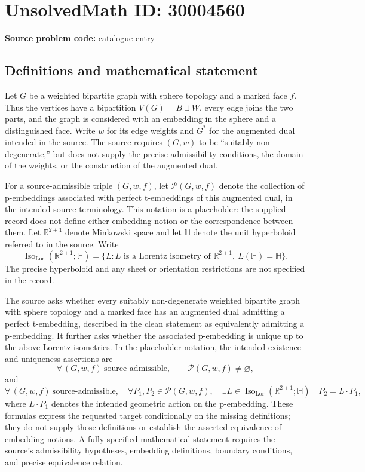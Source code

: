 \documentclass[11pt]{article}
\begin{document}
\section*{UnsolvedMath ID: 30004560}
\textbf{Source problem code:} catalogue entry
\subsection{Definitions and mathematical statement}
Let \(G\) be a weighted bipartite graph with sphere topology and a marked face \(f\). Thus the vertices have a bipartition \(V(G)=B\sqcup W\), every edge joins the two parts, and the graph is considered with an embedding in the sphere and a distinguished face. Write \(w\) for its edge weights and \(G^*\) for the augmented dual intended in the source. The source requires \((G,w)\) to be ``suitably non-degenerate,'' but does not supply the precise admissibility conditions, the domain of the weights, or the construction of the augmented dual.

For a source-admissible triple \((G,w,f)\), let \(\mathcal P(G,w,f)\) denote the collection of p-embeddings associated with perfect t-embeddings of this augmented dual, in the intended source terminology. This notation is a placeholder: the supplied record does not define either embedding notion or the correspondence between them. Let \(\mathbb R^{2+1}\) denote Minkowski space and let \(\mathbb H\) denote the unit hyperboloid referred to in the source. Write
\[
\operatorname{Iso}_{\mathrm{Lor}}(\mathbb R^{2+1};\mathbb H)
=
\{L: L\text{ is a Lorentz isometry of }\mathbb R^{2+1},\ L(\mathbb H)=\mathbb H\}.
\]
The precise hyperboloid and any sheet or orientation restrictions are not specified in the record.

The source asks whether every suitably non-degenerate weighted bipartite graph with sphere topology and a marked face has an augmented dual admitting a perfect t-embedding, described in the clean statement as equivalently admitting a p-embedding. It further asks whether the associated p-embedding is unique up to the above Lorentz isometries. In the placeholder notation, the intended existence and uniqueness assertions are
\[
\forall\,(G,w,f)\ \text{source-admissible},\qquad
\mathcal P(G,w,f)\ne\varnothing,
\]
and
\[
\forall\,(G,w,f)\ \text{source-admissible},\quad
\forall P_1,P_2\in\mathcal P(G,w,f),\quad
\exists L\in\operatorname{Iso}_{\mathrm{Lor}}(\mathbb R^{2+1};\mathbb H)
\quad P_2=L\cdot P_1,
\]
where \(L\cdot P_1\) denotes the intended geometric action on the p-embedding. These formulas express the requested target conditionally on the missing definitions; they do not supply those definitions or establish the asserted equivalence of embedding notions. A fully specified mathematical statement requires the source's admissibility hypotheses, embedding definitions, boundary conditions, and precise equivalence relation.
\end{document}
